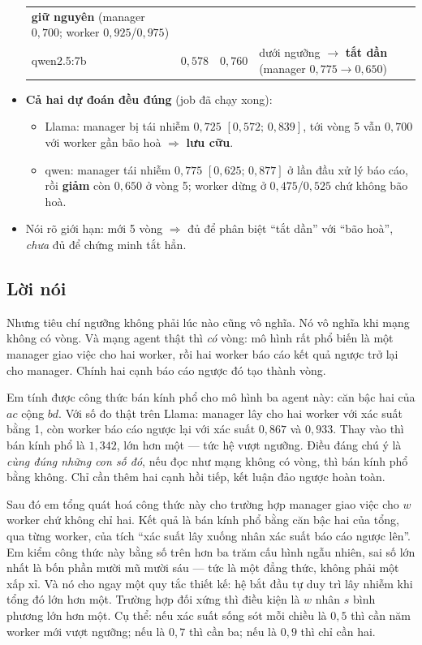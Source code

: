 \documentclass[11pt,a4paper]{article}
\newcommand{\loinoi}{\subsection*{Lời nói}}
\begin{document}
\begin{itemize}
\begin{center}
\begin{tabular}{|l|c|c|l|}
          \textbf{giữ nguyên} (manager $0{,}700$; worker $0{,}925$/$0{,}975$)\\
        qwen2.5:7b & $0{,}578$ & $0{,}760$ & dưới ngưỡng $\to$
          \textbf{tắt dần} (manager $0{,}775 \to 0{,}650$)\\
        \hline
        \end{tabular}
        \end{center}
  \item \textbf{Cả hai dự đoán đều đúng} (job đã chạy xong):
        \begin{itemize}
          \item Llama: manager bị tái nhiễm $0{,}725$ $[0{,}572;\,0{,}839]$, tới vòng 5
                vẫn $0{,}700$ với worker gần bão hoà $\Rightarrow$ \textbf{lưu cữu}.
          \item qwen: manager tái nhiễm $0{,}775$ $[0{,}625;\,0{,}877]$ ở lần đầu xử lý
                báo cáo, rồi \textbf{giảm} còn $0{,}650$ ở vòng 5; worker dừng ở
                $0{,}475$/$0{,}525$ chứ không bão hoà.
        \end{itemize}
  \item Nói rõ giới hạn: mới 5 vòng $\Rightarrow$ đủ để phân biệt ``tắt dần'' với ``bão
        hoà'', \emph{chưa} đủ để chứng minh tắt hẳn.
\end{itemize}

\loinoi
Nhưng tiêu chí ngưỡng không phải lúc nào cũng vô nghĩa. Nó vô nghĩa khi mạng không có
vòng. Và mạng agent thật thì \emph{có} vòng: mô hình rất phổ biến là một manager giao
việc cho hai worker, rồi hai worker báo cáo kết quả ngược trở lại cho manager. Chính
hai cạnh báo cáo ngược đó tạo thành vòng.

Em tính được công thức bán kính phổ cho mô hình ba agent này: căn bậc hai của $ac$ cộng
$bd$. Với số đo thật trên Llama: manager lây cho hai worker với xác suất bằng 1, còn
worker báo cáo ngược lại với xác suất $0{,}867$ và $0{,}933$. Thay vào thì bán kính phổ
là $1{,}342$, lớn hơn một --- tức hệ vượt ngưỡng. Điều đáng chú ý là \emph{cùng đúng
những con số đó}, nếu đọc như mạng không có vòng, thì bán kính phổ bằng không. Chỉ cần
thêm hai cạnh hồi tiếp, kết luận đảo ngược hoàn toàn.

Sau đó em tổng quát hoá công thức này cho trường hợp manager giao việc cho $w$ worker
chứ không chỉ hai. Kết quả là bán kính phổ bằng căn bậc hai của tổng, qua từng worker,
của tích ``xác suất lây xuống nhân xác suất báo cáo ngược lên''. Em kiểm công thức này
bằng số trên hơn ba trăm cấu hình ngẫu nhiên, sai số lớn nhất là bốn phần mười mũ mười
sáu --- tức là một đẳng thức, không phải một xấp xỉ. Và nó cho ngay một quy tắc thiết
kế: hệ bắt đầu tự duy trì lây nhiễm khi tổng đó lớn hơn một. Trường hợp đối xứng thì
điều kiện là $w$ nhân $s$ bình phương lớn hơn một. Cụ thể: nếu xác suất sống sót mỗi
chiều là $0{,}5$ thì cần năm worker mới vượt ngưỡng; nếu là $0{,}7$ thì cần ba; nếu là
$0{,}9$ thì chỉ cần hai.
\end{document}
